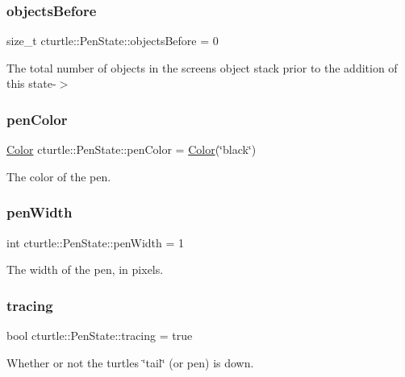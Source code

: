 \subsubsection{\texorpdfstring{objects\+Before}{objectsBefore}}
{\footnotesize\ttfamily size\+\_\+t cturtle\+::\+Pen\+State\+::objects\+Before = 0}

The total number of objects in the screen\textquotesingle{}s object stack prior to the addition of this state-\/$>$ \mbox{\label{structcturtle_1_1PenState_a2fb76e7573bfa387e1858df701dab60b}} 
\subsubsection{\texorpdfstring{pen\+Color}{penColor}}
{\footnotesize\ttfamily \hyperlink{classcturtle_1_1Color}{Color} cturtle\+::\+Pen\+State\+::pen\+Color = \hyperlink{classcturtle_1_1Color}{Color}(\char`\"{}black\char`\"{})}

The color of the pen. \mbox{\label{structcturtle_1_1PenState_a5ca3f05c53ca672de4466e4c7f5f3328}} 
\subsubsection{\texorpdfstring{pen\+Width}{penWidth}}
{\footnotesize\ttfamily int cturtle\+::\+Pen\+State\+::pen\+Width = 1}

The width of the pen, in pixels. \mbox{\label{structcturtle_1_1PenState_aa6992297fb8f109e20599c31dd29cd6f}} 
\subsubsection{\texorpdfstring{tracing}{tracing}}
{\footnotesize\ttfamily bool cturtle\+::\+Pen\+State\+::tracing = true}

Whether or not the turtle\textquotesingle{}s \char`\"{}tail\char`\"{} (or pen) is down. \mbox{\label{structcturtle_1_1PenState_ac6b3e58155d09bf78a315c616874fa89}} 
